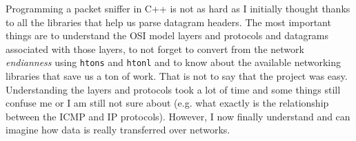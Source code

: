 \documentclass[a4paper]{article}
\begin{document}
  Programming a packet sniffer in C++ is not as hard as I initially thought
  thanks to all the libraries that help us parse datagram headers. The most
  important things are to understand the OSI model layers and protocols and 
  datagrams associated with those layers, to not forget to convert from the 
  network \textit{endianness} using \verb|htons| and \verb|htonl| and to know
  about the available networking libraries that save us a ton of work. That
  is not to say that the project was easy. Understanding the layers and 
  protocols took a lot of time and some things still confuse me or I am still 
  not sure about (e.g. what exactly is the relationship between the ICMP and IP
  protocols). However, I now finally understand and can imagine how data is 
  really transferred over networks.

  \newpage


  
  
\end{document}
